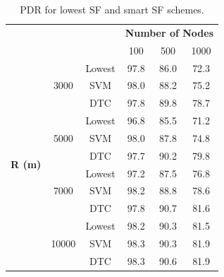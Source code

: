 \documentclass[conference]{IEEEtran}
\begin{document}
\begin{table}
\centering
\caption{PDR for lowest SF and smart SF schemes.}
\label{table:prediction_pdr}
\begin{tabular}{|c|c|c|c|c|c|}
\hline
\multicolumn{3}{|c|}{\multirow{2}{*}{}}                            & \multicolumn{3}{c|}{\textbf{Number of Nodes}} \\ \cline{4-6}
\multicolumn{3}{|c|}{}                                             & 100           & 500           & 1000          \\ \hline
\multirow{12}{*}{\textbf{R (m)}} & \multirow{3}{*}{3000}  & Lowest & 97.8          & 86.0          & 72.3          \\ \cline{3-6}
                                 &                        & SVM    & 98.0          & 88.2          & 75.2          \\ \cline{3-6}
                                 &                        & DTC    & 97.8          & 89.8          & 78.7          \\ \cline{2-6}

                                 & \multirow{3}{*}{5000}  & Lowest & 96.8          & 85.5          & 71.2          \\ \cline{3-6}
                                 &                        & SVM    & 98.0          & 87.8          & 74.8          \\ \cline{3-6}
                                 &                        & DTC    & 97.7          & 90.2          & 79.8          \\ \cline{2-6}

                                 & \multirow{3}{*}{7000}  & Lowest & 97.2          & 87.5          & 76.8          \\ \cline{3-6}
                                 &                        & SVM    & 98.2          & 88.8          & 78.6          \\ \cline{3-6}
                                 &                        & DTC    & 97.8          & 90.7          & 81.6          \\ \cline{2-6}

                                 & \multirow{3}{*}{10000} & Lowest & 98.2          & 90.3          & 81.5          \\ \cline{3-6}
                                 &                        & SVM    & 98.3          & 90.3          & 81.9          \\ \cline{3-6}
                                 &                        & DTC    & 98.3          & 90.6          & 81.9          \\ \hline
\end{tabular}
\end{table}
\end{document}
